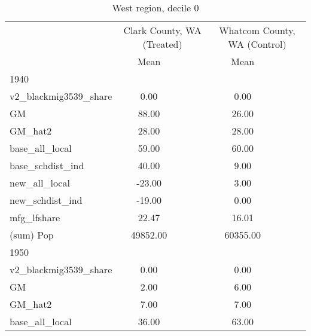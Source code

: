 \begin{table}[htbp]\centering
\def\sym#1{\ifmmode^{#1}\else\(^{#1}\)\fi}
\caption{West region, decile 0 \label{tab1}}
\begin{tabular}{l*{2}{ccc}}
\toprule
                    &\multicolumn{3}{c}{Clark County, WA (Treated)}&\multicolumn{3}{c}{Whatcom County, WA (Control)}\\
                    &        Mean&            &            &        Mean&            &            \\
\midrule
1940                &            &            &            &            &            &            \\
v2\_blackmig3539\_share&        0.00&            &            &        0.00&            &            \\
GM                  &       88.00&            &            &       26.00&            &            \\
GM\_hat2             &       28.00&            &            &       28.00&            &            \\
base\_all\_local      &       59.00&            &            &       60.00&            &            \\
base\_schdist\_ind    &       40.00&            &            &        9.00&            &            \\
new\_all\_local       &      -23.00&            &            &        3.00&            &            \\
new\_schdist\_ind     &      -19.00&            &            &        0.00&            &            \\
mfg\_lfshare         &       22.47&            &            &       16.01&            &            \\
(sum) Pop           &    49852.00&            &            &    60355.00&            &            \\
\midrule
1950                &            &            &            &            &            &            \\
v2\_blackmig3539\_share&        0.00&            &            &        0.00&            &            \\
GM                  &        2.00&            &            &        6.00&            &            \\
GM\_hat2             &        7.00&            &            &        7.00&            &            \\
base\_all\_local      &       36.00&            &            &       63.00&            &            \\

\end{tabular}
\end{table}
